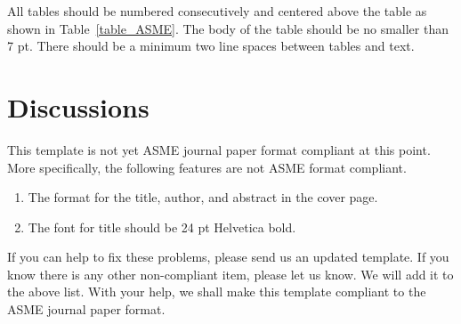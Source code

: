 \documentclass[twocolumn,10pt]{asme2ej}
\begin{document}
All tables should be numbered consecutively  and centered above the table as shown in Table~\ref{table_ASME}. The body of the table should be no smaller than 7 pt.  There should be a minimum two line spaces between tables and text.

\section{Discussions}
This template is not yet ASME journal paper format compliant at this point.
More specifically, the following features are not ASME format compliant.
\begin{enumerate}
\item
The format for the title, author, and abstract in the cover page.
\item
The font for title should be 24 pt Helvetica bold.
\end{enumerate}

\noindent
If you can help to fix these problems, please send us an updated template.
If you know there is any other non-compliant item, please let us know.
We will add it to the above list.
With your help, we shall make this template 
compliant to the ASME journal paper format.


%

%

%

\appendix       %
\end{document}
